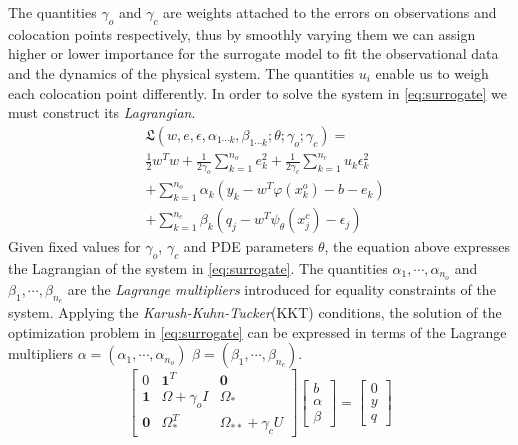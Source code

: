 The quantities $\gamma_{o}$ and $\gamma_{c}$ are weights attached to
the errors on observations and colocation points respectively, thus
by smoothly varying them we can assign higher or lower importance for
the surrogate model to fit the observational data and the dynamics of
the physical system. The quantities $u_i$ enable us to weigh each colocation
point differently.
%
In order to solve the system in \cref{eq:surrogate} we must construct its \emph{Lagrangian}.
%
\begin{align*}\label{eq:lag}
      & \mathfrak{L}(w,e,\epsilon, \alpha_{1 \cdots k}, \beta_{1 \cdots k}; \theta; \gamma_{o}; \gamma_{c}) = \\ 
      & \frac{1}{2} w^{T}w + \frac{1}{2\gamma_{o}} \sum_{k = 1}^{n_{o}}{e^{2}_{k}} +
      \frac{1}{2\gamma_{c}} \sum_{k = 1}^{n_{c}}{u_{k} \epsilon^{2}_{k}} \\
      & + \sum_{k = 1}^{n_{o}}{\alpha_{k}(y_{k} - w^{T}\varphi(x^{o}_{k}) - b - e_{k})} \\
      & + \sum_{k = 1}^{n_{c}}{\beta_{k} (q_{j} - w^{T}\psi_{\theta}(x^{c}_{j}) - \epsilon_{j})} 
\end{align*}
%
Given fixed values for $\gamma_{o}$, $\gamma_{c}$ and PDE parameters
$\theta$, the equation above expresses the Lagrangian of the system in 
\cref{eq:surrogate}. The quantities $\alpha_{1}, \cdots, \alpha_{n_{o}}$ and
$\beta_{1}, \cdots, \beta_{n_{c}}$ are the \emph{Lagrange multipliers}
introduced for equality constraints of the system. Applying the
\emph{Karush-Kuhn-Tucker}(KKT) conditions, the solution of the
optimization problem in \cref{eq:surrogate} can be expressed in terms of
the Lagrange multipliers $\alpha = (\alpha_{1}, \cdots, \alpha_{n_{o}})$
$\beta = (\beta_{1}, \cdots, \beta_{n_{c}})$.
%
\begin{equation}\label{eq:solution}
  \begin{bmatrix}
    0 & \mathbf{1}^{T} & \mathbf{0} \\ 
    \mathbf{1} & \Omega + \gamma_{o}I  & \Omega_*\\ 
    \mathbf{0} & \Omega_{*}^{T}  & \Omega_{**} + \gamma_{c}U 
  \end{bmatrix} \begin{bmatrix}
    b\\ 
    \alpha\\ 
    \beta
  \end{bmatrix} = \begin{bmatrix}
    0\\ 
    y\\ 
    q
  \end{bmatrix}
\end{equation}

